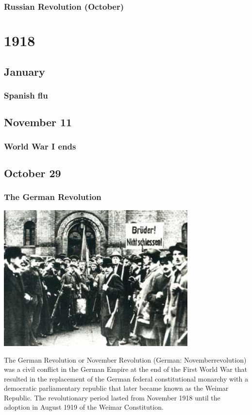 \documentclass[11pt]{report}
\begin{document}
\subsection{Russian Revolution (October)}


\chapter{1918}
\section{January}
\subsection{Spanish flu}

\section{November 11}
\subsection{World War I ends}

\section{October 29}
\subsection{The German Revolution}
\vspace{2mm}\begin{center}\includegraphics[width=10cm]{./img/germanRevolution.jpg}\end{center}
The German Revolution or November Revolution (German: Novemberrevolution) was a civil conflict in the German Empire at the end of the First World War that resulted in the replacement of the German federal constitutional monarchy with a democratic parliamentary republic that later became known as the Weimar Republic. The revolutionary period lasted from November 1918 until the adoption in August 1919 of the Weimar Constitution.
\end{document}
